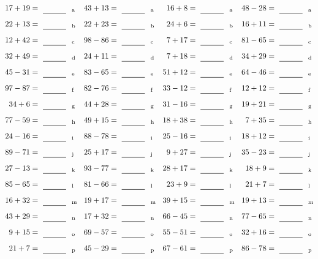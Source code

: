 \documentclass
[
  draft    = true,
  fontsize = 11pt,
  parskip  = half-
]
{scrartcl}
\begin{document}
\clearpage
\begin{align*}
    \pline{17+19}&=\rline{a}
  & \pline{43+13}&=\rline{a}
  & \pline{16+8}&=\rline{a}
  & \pline{48-28}&=\rline{a} \\[1ex]
    \pline{22+13}&=\rline{b}
  & \pline{22+23}&=\rline{b}
  & \pline{24+6}&=\rline{b}
  & \pline{16+11}&=\rline{b} \\[1ex]
    \pline{12+42}&=\rline{c}
  & \pline{98-86}&=\rline{c}
  & \pline{7+17}&=\rline{c}
  & \pline{81-65}&=\rline{c} \\[1ex]
    \pline{32+49}&=\rline{d}
  & \pline{24+11}&=\rline{d}
  & \pline{7+18}&=\rline{d}
  & \pline{34+29}&=\rline{d} \\[1ex]
    \pline{45-31}&=\rline{e}
  & \pline{83-65}&=\rline{e}
  & \pline{51+12}&=\rline{e}
  & \pline{64-46}&=\rline{e} \\[1ex]
    \pline{97-87}&=\rline{f}
  & \pline{82-76}&=\rline{f}
  & \pline{33-12}&=\rline{f}
  & \pline{12+12}&=\rline{f} \\[1ex]
    \pline{34+6}&=\rline{g}
  & \pline{44+28}&=\rline{g}
  & \pline{31-16}&=\rline{g}
  & \pline{19+21}&=\rline{g} \\[1ex]
    \pline{77-59}&=\rline{h}
  & \pline{49+15}&=\rline{h}
  & \pline{18+38}&=\rline{h}
  & \pline{7+35}&=\rline{h} \\[1ex]
    \pline{24-16}&=\rline{i}
  & \pline{88-78}&=\rline{i}
  & \pline{25-16}&=\rline{i}
  & \pline{18+12}&=\rline{i} \\[1ex]
    \pline{89-71}&=\rline{j}
  & \pline{25+17}&=\rline{j}
  & \pline{9+27}&=\rline{j}
  & \pline{35-23}&=\rline{j} \\[1ex]
    \pline{27-13}&=\rline{k}
  & \pline{93-77}&=\rline{k}
  & \pline{28+17}&=\rline{k}
  & \pline{18+9}&=\rline{k} \\[1ex]
    \pline{85-65}&=\rline{l}
  & \pline{81-66}&=\rline{l}
  & \pline{23+9}&=\rline{l}
  & \pline{21+7}&=\rline{l} \\[1ex]
    \pline{16+32}&=\rline{m}
  & \pline{19+17}&=\rline{m}
  & \pline{39+15}&=\rline{m}
  & \pline{19+13}&=\rline{m} \\[1ex]
    \pline{43+29}&=\rline{n}
  & \pline{17+32}&=\rline{n}
  & \pline{66-45}&=\rline{n}
  & \pline{77-65}&=\rline{n} \\[1ex]
    \pline{9+15}&=\rline{o}
  & \pline{69-57}&=\rline{o}
  & \pline{55-51}&=\rline{o}
  & \pline{32+16}&=\rline{o} \\[1ex]
    \pline{21+7}&=\rline{p}
  & \pline{45-29}&=\rline{p}
  & \pline{67-61}&=\rline{p}
  & \pline{86-78}&=\rline{p}
\end{align*}
\end{document}
